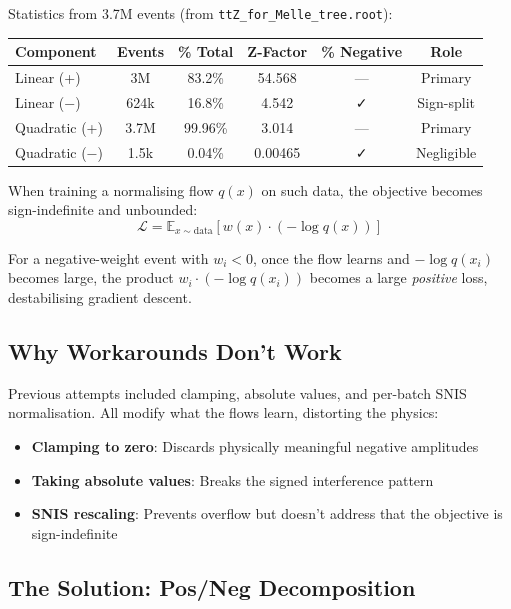 \documentclass[11pt,a4paper]{article}
\begin{document}
\noindent Statistics from 3.7M events (from \texttt{ttZ\_for\_Melle\_tree.root}):
\begin{table}[h!]
\centering
\begin{tabular}{lccccc}
\toprule
Component & Events & \% Total & Z-Factor & \% Negative & Role \\
\midrule
Linear (+) & 3M & 83.2\% & 54.568 & — & Primary \\[1pt]
Linear (−) & 624k & 16.8\% & 4.542 & ✓ & Sign-split \\[1pt]
Quadratic (+) & 3.7M & 99.96\% & 3.014 & — & Primary \\[1pt]
Quadratic (−) & 1.5k & 0.04\% & 0.00465 & ✓ & Negligible \\[1pt]
\bottomrule
\end{tabular}
\end{table}

When training a normalising flow $q(x)$ on such data, the objective becomes sign-indefinite and unbounded:
\begin{equation}
\mathcal{L} = \mathbb{E}_{x \sim \text{data}}[w(x) \cdot (-\log q(x))]
\end{equation}

For a negative-weight event with $w_i < 0$, once the flow learns and $-\log q(x_i)$ becomes large, 
the product $w_i \cdot (-\log q(x_i))$ becomes a large \emph{positive} loss, destabilising gradient descent.

\subsection{Why Workarounds Don't Work}

Previous attempts included clamping, absolute values, and per-batch SNIS normalisation. All modify what 
the flows learn, distorting the physics:
\begin{itemize}
  \item \textbf{Clamping to zero}: Discards physically meaningful negative amplitudes
  \item \textbf{Taking absolute values}: Breaks the signed interference pattern
  \item \textbf{SNIS rescaling}: Prevents overflow but doesn't address that the objective is sign-indefinite
\end{itemize}

\subsection{The Solution: Pos/Neg Decomposition}
\end{document}
